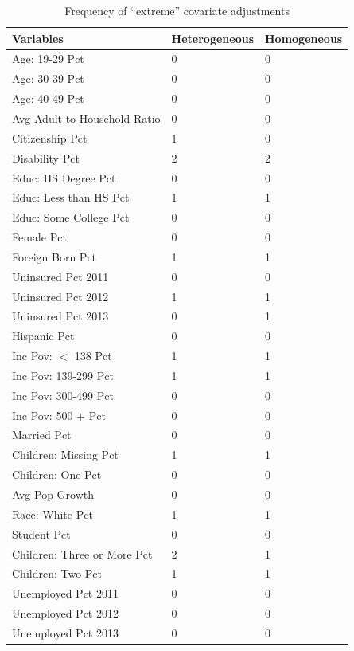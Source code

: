 \begin{table}[h!]
\centering
    \caption{Frequency of ``extreme'' covariate adjustments}
    \label{tab:extreme1}
\begin{tabular}{lll}
  \hline
Variables & Heterogeneous & Homogeneous \\ 
  \hline
Age: 19-29 Pct & 0 & 0 \\ 
  Age: 30-39 Pct & 0 & 0 \\ 
  Age: 40-49 Pct & 0 & 0 \\ 
  Avg Adult to Household Ratio & 0 & 0 \\ 
  Citizenship Pct & 1 & 0 \\ 
  Disability Pct & 2 & 2 \\ 
  Educ: HS Degree Pct & 0 & 0 \\ 
  Educ: Less than HS Pct & 1 & 1 \\ 
  Educ: Some College Pct & 0 & 0 \\ 
  Female Pct & 0 & 0 \\ 
  Foreign Born Pct & 1 & 1 \\ 
  Uninsured Pct 2011 & 0 & 0 \\ 
  Uninsured Pct 2012 & 1 & 1 \\ 
  Uninsured Pct 2013 & 0 & 1 \\ 
  Hispanic Pct & 0 & 0 \\ 
  Inc Pov: $<$ 138 Pct & 1 & 1 \\ 
  Inc Pov: 139-299 Pct & 1 & 1 \\ 
  Inc Pov: 300-499 Pct & 0 & 0 \\ 
  Inc Pov: 500 + Pct & 0 & 0 \\ 
  Married Pct & 0 & 0 \\ 
  Children: Missing Pct & 1 & 1 \\ 
  Children: One Pct & 0 & 0 \\ 
  Avg Pop Growth & 0 & 0 \\ 
  Race: White Pct & 1 & 1 \\ 
  Student Pct & 0 & 0 \\ 
  Children: Three or More Pct & 2 & 1 \\ 
  Children: Two Pct & 1 & 1 \\ 
  Unemployed Pct 2011 & 0 & 0 \\ 
  Unemployed Pct 2012 & 0 & 0 \\ 
  Unemployed Pct 2013 & 0 & 0 \\ 
   \hline
\end{tabular}
\end{table}

